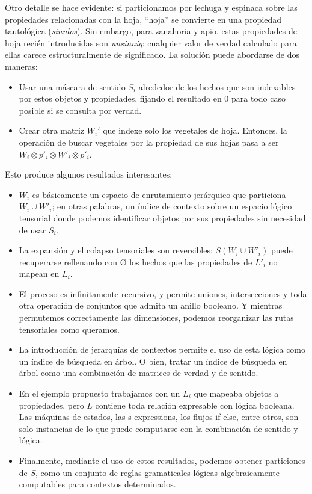 \documentclass{article}
\providecommand{\tightlist}{%
  \setlength{\itemsep}{0pt}\setlength{\parskip}{0pt}}
\begin{document}
Otro detalle se hace evidente: si particionamos por lechuga y espinaca
sobre las propiedades relacionadas con la hoja, ``hoja'' se convierte en
una propiedad tautológica (\emph{sinnlos}). Sin embargo, para zanahoria
y apio, estas propiedades de hoja recién introducidas son
\emph{unsinnig}: cualquier valor de verdad calculado para ellas carece
estructuralmente de significado. La solución puede abordarse de dos
maneras:

\begin{itemize}
\item
  Usar una máscara de sentido \(S_i\) alrededor de los hechos que son
  indexables por estos objetos y propiedades, fijando el resultado en 0
  para todo caso posible si se consulta por verdad.
\item
  Crear otra matriz \(W_i'\) que indexe solo los vegetales de hoja.
  Entonces, la operación de buscar vegetales por la propiedad de sus
  hojas pasa a ser \(W_i \otimes p'_i \otimes W'_i \otimes p'_i\).
\end{itemize}

Esto produce algunos resultados interesantes:

\begin{itemize}
\tightlist
\item
  \(W_i\) es básicamente un espacio de enrutamiento jerárquico que
  particiona \(W_i \cup W'_i\); en otras palabras, un índice de contexto
  sobre un espacio lógico tensorial donde podemos identificar objetos
  por sus propiedades sin necesidad de usar \(S_i\).
\item
  La expansión y el colapso tensoriales son reversibles:
  \(S( W_i \cup W'_i)\) puede recuperarse rellenando con Ø los hechos
  que las propiedades de \(L'_i\) no mapean en \(L_i\).
\item
  El proceso es infinitamente recursivo, y permite uniones,
  intersecciones y toda otra operación de conjuntos que admita un anillo
  booleano. Y mientras permutemos correctamente las dimensiones, podemos
  reorganizar las rutas tensoriales como queramos.
\item
  La introducción de jerarquías de contextos permite el uso de esta
  lógica como un índice de búsqueda en árbol. O bien, tratar un índice
  de búsqueda en árbol como una combinación de matrices de verdad y de
  sentido.
\item
  En el ejemplo propuesto trabajamos con un \(L_i\) que mapeaba objetos
  a propiedades, pero \(L\) contiene toda relación expresable con lógica
  booleana. Las máquinas de estados, las s-expressions, los flujos
  if-else, entre otros, son solo instancias de lo que puede computarse
  con la combinación de sentido y lógica.
\item
  Finalmente, mediante el uso de estos resultados, podemos obtener
  particiones de \(S\), como un conjunto de reglas gramaticales lógicas
  algebraicamente computables para contextos determinados.
\end{itemize}
\end{document}
